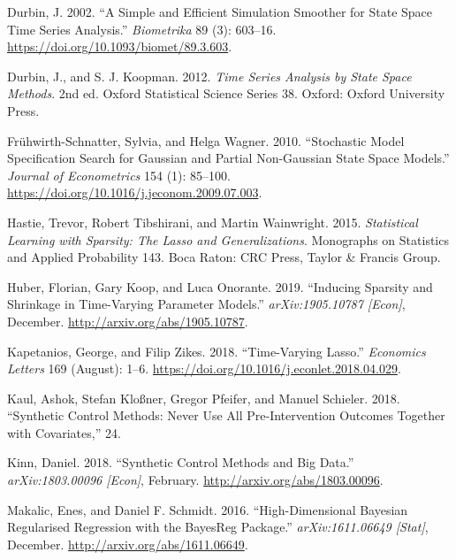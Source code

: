 \documentclass[
]{article}
\begin{document}
\leavevmode\hypertarget{ref-durbin_simple_2002}{}%
Durbin, J. 2002. ``A Simple and Efficient Simulation Smoother for State
Space Time Series Analysis.'' \emph{Biometrika} 89 (3): 603--16.
\url{https://doi.org/10.1093/biomet/89.3.603}.

\leavevmode\hypertarget{ref-durbin_time_2012}{}%
Durbin, J., and S. J. Koopman. 2012. \emph{Time Series Analysis by State
Space Methods}. 2nd ed. Oxford Statistical Science Series 38. Oxford:
Oxford University Press.

\leavevmode\hypertarget{ref-fruhwirth-schnatter_stochastic_2010}{}%
Frühwirth-Schnatter, Sylvia, and Helga Wagner. 2010. ``Stochastic Model
Specification Search for Gaussian and Partial Non-Gaussian State Space
Models.'' \emph{Journal of Econometrics} 154 (1): 85--100.
\url{https://doi.org/10.1016/j.jeconom.2009.07.003}.

\leavevmode\hypertarget{ref-hastie_statistical_2015}{}%
Hastie, Trevor, Robert Tibshirani, and Martin Wainwright. 2015.
\emph{Statistical Learning with Sparsity: The Lasso and
Generalizations}. Monographs on Statistics and Applied Probability 143.
Boca Raton: CRC Press, Taylor \& Francis Group.

\leavevmode\hypertarget{ref-huber_inducing_2019}{}%
Huber, Florian, Gary Koop, and Luca Onorante. 2019. ``Inducing Sparsity
and Shrinkage in Time-Varying Parameter Models.'' \emph{arXiv:1905.10787
{[}Econ{]}}, December. \url{http://arxiv.org/abs/1905.10787}.

\leavevmode\hypertarget{ref-kapetanios_time-varying_2018}{}%
Kapetanios, George, and Filip Zikes. 2018. ``Time-Varying Lasso.''
\emph{Economics Letters} 169 (August): 1--6.
\url{https://doi.org/10.1016/j.econlet.2018.04.029}.

\leavevmode\hypertarget{ref-kaul_synthetic_2018}{}%
Kaul, Ashok, Stefan Kloßner, Gregor Pfeifer, and Manuel Schieler. 2018.
``Synthetic Control Methods: Never Use All Pre-Intervention Outcomes
Together with Covariates,'' 24.

\leavevmode\hypertarget{ref-kinn_synthetic_2018}{}%
Kinn, Daniel. 2018. ``Synthetic Control Methods and Big Data.''
\emph{arXiv:1803.00096 {[}Econ{]}}, February.
\url{http://arxiv.org/abs/1803.00096}.

\leavevmode\hypertarget{ref-makalic_high-dimensional_2016}{}%
Makalic, Enes, and Daniel F. Schmidt. 2016. ``High-Dimensional Bayesian
Regularised Regression with the BayesReg Package.''
\emph{arXiv:1611.06649 {[}Stat{]}}, December.
\url{http://arxiv.org/abs/1611.06649}.
\end{document}
